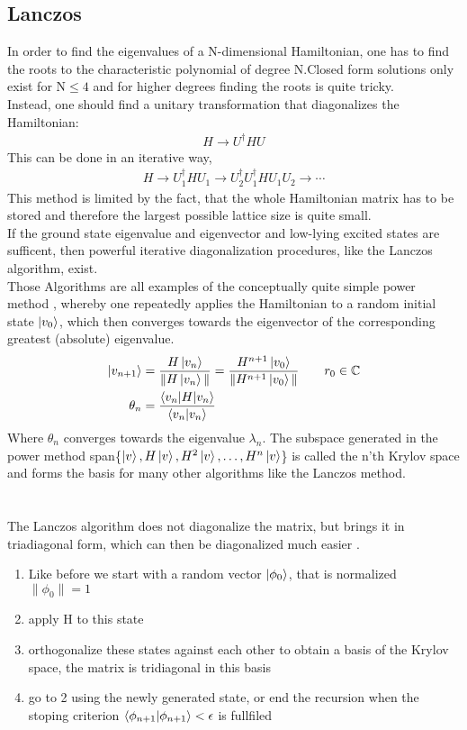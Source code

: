 \documentclass{article}
\begin{document}
\subsection{Lanczos}
In order to find the eigenvalues of a N-dimensional Hamiltonian, one
has to find the roots to the characteristic polynomial of degree
N.Closed form solutions only exist for N$\leq4$ and for higher degrees
finding the roots is quite tricky.\\
Instead, one should find a unitary transformation that diagonalizes
the Hamiltonian:
\begin{align*}
H \to U^{\dagger} H U
\end{align*}
This can be done in an iterative way,
\begin{align*}
H \to U_1^{\dagger} H U_1 \to U_2^{\dagger}U_1^{\dagger} H U_1U_2 \to \dotsm
\end{align*}
This method is limited by the fact, that the whole Hamiltonian matrix
has to be stored and therefore the largest possible lattice size is
quite small.\\
If the ground state eigenvalue and eigenvector and low-lying excited
states are sufficent, then powerful iterative diagonalization
procedures, like the Lanczos algorithm, exist.\\
Those Algorithms are all examples of the conceptually quite simple
power method \cite{Noack},
whereby one repeatedly applies the Hamiltonian to a random initial
state $\ket{v_0}$, which then converges towards the eigenvector of the
corresponding greatest (absolute) eigenvalue.
\begin{align*}
\ket{v_{n+1}} &= \frac{H \ket{v_n}}{\| H \ket{v_n} \|} =\frac{H^{n+1} \ket{v_0}}{\| H^{n+1} \ket{v_0} \|}  \qquad r_0 \in \mathbb{C}\\
\theta_n &= \frac{\braket{v_n|H|v_n}}{\braket{v_n|v_n}}
\end{align*}
Where $\theta_n$ converges towards the eigenvalue $\lambda_n$. The
subspace generated in the power method
 span\{$\ket{v},H \ket{v}, H^2 \ket{v}, \dotsc,H^n \ket{v}$\} 
is called the n'th Krylov space and forms the basis for many other
algorithms like the Lanczos method.\\
\\
\\
The Lanczos algorithm does not diagonalize the matrix, but brings it
in  triadiagonal form, which can then be diagonalized much easier \cite{Fehske}.
\begin{enumerate}
\item\label{item:1} Like before we start with a random vector
  $\ket{\phi_0}$, that is normalized\\
 $\|\phi_0\| = 1$
\item\label{item:2} apply H to this state
\item\label{item:3} orthogonalize these states against each other to
  obtain a basis of the Krylov space, the matrix is tridiagonal in this basis
\item\label{item:4} go to 2 using the newly generated state, or end the
  recursion when the stoping criterion $\braket{\phi_{n+1}|\phi_{n+1}}
  < \epsilon$ is fullfiled 

\end{enumerate}
\end{document}
